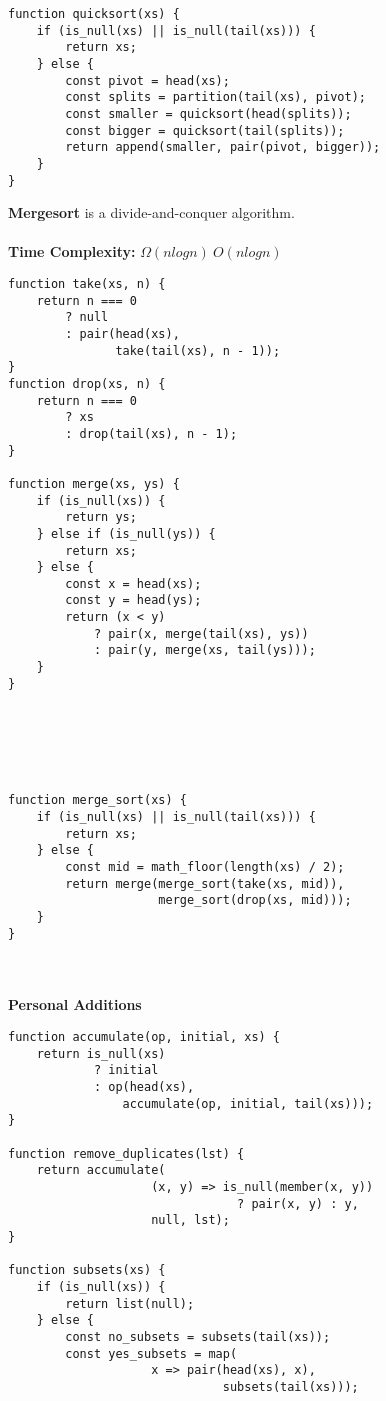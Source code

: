 \documentclass[a4paper]{article} \usepackage[backend=biber, style=numeric, sorting=none]{biblatex}
\begin{document}
\begin{multicols*}{4}
\begin{verbatim}
function quicksort(xs) {
    if (is_null(xs) || is_null(tail(xs))) {
        return xs;
    } else {
        const pivot = head(xs);
        const splits = partition(tail(xs), pivot);
        const smaller = quicksort(head(splits));
        const bigger = quicksort(tail(splits));
        return append(smaller, pair(pivot, bigger));
    }
}
\end{verbatim}
{\small\textbf{Mergesort}} is a divide-and-conquer algorithm.
\\ \\
\textbf{Time Complexity:} $\Omega(n log n)\ O(n log n)$
\begin{verbatim}
function take(xs, n) {
    return n === 0
        ? null
        : pair(head(xs),
               take(tail(xs), n - 1));
}
function drop(xs, n) {
    return n === 0
        ? xs
        : drop(tail(xs), n - 1);
}

function merge(xs, ys) {
    if (is_null(xs)) { 
        return ys;
    } else if (is_null(ys)) { 
        return xs;
    } else {
        const x = head(xs);
        const y = head(ys);
        return (x < y) 
            ? pair(x, merge(tail(xs), ys))
            : pair(y, merge(xs, tail(ys)));
    }
}






function merge_sort(xs) {
    if (is_null(xs) || is_null(tail(xs))) {
        return xs;
    } else {
        const mid = math_floor(length(xs) / 2);  
        return merge(merge_sort(take(xs, mid)), 
                     merge_sort(drop(xs, mid)));
    }
}
\end{verbatim}
\divider
\\
\\
{\small\textbf{Personal Additions}}

\begin{verbatim}
function accumulate(op, initial, xs) {
    return is_null(xs) 
            ? initial
            : op(head(xs), 
                accumulate(op, initial, tail(xs)));
}

function remove_duplicates(lst) {
    return accumulate(
                    (x, y) => is_null(member(x, y)) 
                                ? pair(x, y) : y,
                    null, lst);
}

function subsets(xs) {
    if (is_null(xs)) {
        return list(null);
    } else {
        const no_subsets = subsets(tail(xs));
        const yes_subsets = map(
                    x => pair(head(xs), x),
                              subsets(tail(xs)));
        

\end{verbatim}
\end{multicols*}
\end{document}
